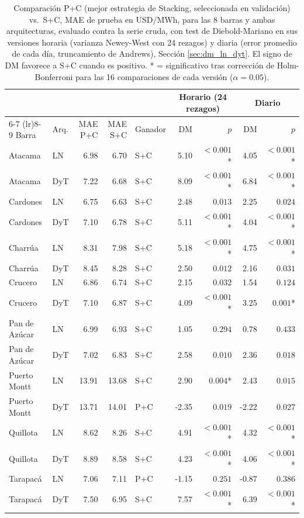 \begin{table}[htbp]
    \centering
    \small
    \setlength{\tabcolsep}{4pt}
    \begin{tabular}{llrrlrrrr}
        \toprule
        & & & & & \multicolumn{2}{c}{Horario (24 rezagos)} & \multicolumn{2}{c}{Diario} \\
        \cmidrule(lr){6-7} \cmidrule(lr){8-9}
        Barra & Arq. & MAE P+C & MAE S+C & Ganador & DM & $p$ & DM & $p$ \\
        \midrule
        Atacama       & LN  & 6.98 & 6.70 & S+C & 5.10 & $<0.001$* & 4.05 & $<0.001$* \\
        Atacama       & DyT & 7.22 & 6.68 & S+C & 8.09 & $<0.001$* & 6.84 & $<0.001$* \\
        Cardones      & LN  & 6.75 & 6.63 & S+C & 2.48 & $0.013$ & 2.25 & $0.024$ \\
        Cardones      & DyT & 7.10 & 6.78 & S+C & 5.11 & $<0.001$* & 4.04 & $<0.001$* \\
        Charrúa       & LN  & 8.31 & 7.98 & S+C & 5.18 & $<0.001$* & 4.75 & $<0.001$* \\
        Charrúa       & DyT & 8.45 & 8.28 & S+C & 2.50 & $0.012$ & 2.16 & $0.031$ \\
        Crucero       & LN  & 6.86 & 6.74 & S+C & 2.15 & $0.032$ & 1.54 & $0.124$ \\
        Crucero       & DyT & 7.10 & 6.87 & S+C & 4.09 & $<0.001$* & 3.25 & $0.001$* \\
        Pan de Azúcar & LN  & 6.99 & 6.93 & S+C & 1.05 & $0.294$ & 0.78 & $0.433$ \\
        Pan de Azúcar & DyT & 7.02 & 6.83 & S+C & 2.58 & $0.010$ & 2.36 & $0.018$ \\
        Puerto Montt  & LN  & 13.91 & 13.68 & S+C & 2.90 & $0.004$* & 2.43 & $0.015$ \\
        Puerto Montt  & DyT & 13.71 & 14.01 & P+C & -2.35 & $0.019$ & -2.22 & $0.027$ \\
        Quillota      & LN  & 8.62 & 8.26 & S+C & 4.91 & $<0.001$* & 4.32 & $<0.001$* \\
        Quillota      & DyT & 8.89 & 8.58 & S+C & 4.23 & $<0.001$* & 4.06 & $<0.001$* \\
        Tarapacá      & LN  & 7.06 & 7.11 & P+C & -1.15 & $0.251$ & -0.87 & $0.386$ \\
        Tarapacá      & DyT & 7.50 & 6.95 & S+C & 7.57 & $<0.001$* & 6.39 & $<0.001$* \\
        \bottomrule
    \end{tabular}
    \vspace{0.2cm}
    \caption{Comparación P+C (mejor estrategia de Stacking, seleccionada en validación) vs.\ S+C, MAE de prueba en USD/MWh, para las 8 barras y ambas arquitecturas, evaluado contra la serie cruda, con test de Diebold-Mariano en sus versiones horaria (varianza Newey-West con 24 rezagos) y diaria (error promedio de cada día, truncamiento de Andrews), Sección \ref{sec:dm_ln_dyt}. El signo de DM favorece a S+C cuando es positivo. * = significativo tras corrección de Holm-Bonferroni para las 16 comparaciones de cada versión ($\alpha=0.05$).}
    \label{tab:pc_vs_sc}
\end{table}

